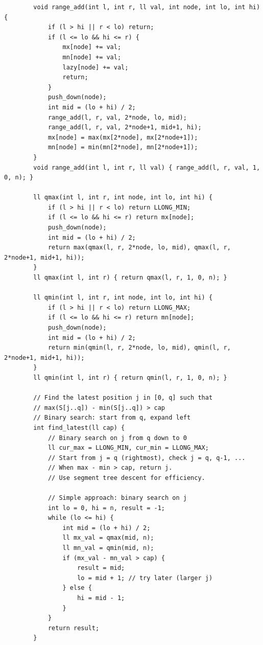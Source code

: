 \documentclass[11pt,a4paper]{article}
\begin{document}
\begin{lstlisting}
        void range_add(int l, int r, ll val, int node, int lo, int hi) {
            if (l > hi || r < lo) return;
            if (l <= lo && hi <= r) {
                mx[node] += val;
                mn[node] += val;
                lazy[node] += val;
                return;
            }
            push_down(node);
            int mid = (lo + hi) / 2;
            range_add(l, r, val, 2*node, lo, mid);
            range_add(l, r, val, 2*node+1, mid+1, hi);
            mx[node] = max(mx[2*node], mx[2*node+1]);
            mn[node] = min(mn[2*node], mn[2*node+1]);
        }
        void range_add(int l, int r, ll val) { range_add(l, r, val, 1, 0, n); }

        ll qmax(int l, int r, int node, int lo, int hi) {
            if (l > hi || r < lo) return LLONG_MIN;
            if (l <= lo && hi <= r) return mx[node];
            push_down(node);
            int mid = (lo + hi) / 2;
            return max(qmax(l, r, 2*node, lo, mid), qmax(l, r, 2*node+1, mid+1, hi));
        }
        ll qmax(int l, int r) { return qmax(l, r, 1, 0, n); }

        ll qmin(int l, int r, int node, int lo, int hi) {
            if (l > hi || r < lo) return LLONG_MAX;
            if (l <= lo && hi <= r) return mn[node];
            push_down(node);
            int mid = (lo + hi) / 2;
            return min(qmin(l, r, 2*node, lo, mid), qmin(l, r, 2*node+1, mid+1, hi));
        }
        ll qmin(int l, int r) { return qmin(l, r, 1, 0, n); }

        // Find the latest position j in [0, q] such that
        // max(S[j..q]) - min(S[j..q]) > cap
        // Binary search: start from q, expand left
        int find_latest(ll cap) {
            // Binary search on j from q down to 0
            ll cur_max = LLONG_MIN, cur_min = LLONG_MAX;
            // Start from j = q (rightmost), check j = q, q-1, ...
            // When max - min > cap, return j.
            // Use segment tree descent for efficiency.

            // Simple approach: binary search on j
            int lo = 0, hi = n, result = -1;
            while (lo <= hi) {
                int mid = (lo + hi) / 2;
                ll mx_val = qmax(mid, n);
                ll mn_val = qmin(mid, n);
                if (mx_val - mn_val > cap) {
                    result = mid;
                    lo = mid + 1; // try later (larger j)
                } else {
                    hi = mid - 1;
                }
            }
            return result;
        }


\end{lstlisting}
\end{document}
